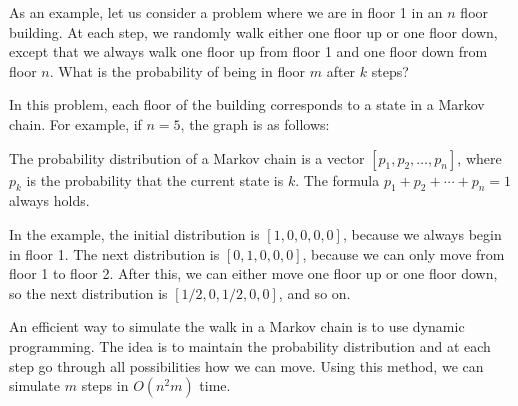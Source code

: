 As an example, let us consider a problem
where we are in floor 1 in an $n$ floor building.
At each step, we randomly walk either one floor
up or one floor down, except that we always
walk one floor up from floor 1 and one floor down
from floor $n$.
What is the probability of being in floor $m$
after $k$ steps?

In this problem, each floor of the building
corresponds to a state in a Markov chain.
For example, if $n=5$, the graph is as follows:

\begin{center}
\end{center}

The probability distribution
of a Markov chain is a vector
$[p_1,p_2,\ldots,p_n]$, where $p_k$ is the
probability that the current state is $k$.
The formula $p_1+p_2+\cdots+p_n=1$ always holds.

In the example, the initial distribution is
$[1,0,0,0,0]$, because we always begin in floor 1.
The next distribution is $[0,1,0,0,0]$,
because we can only move from floor 1 to floor 2.
After this, we can either move one floor up
or one floor down, so the next distribution is
$[1/2,0,1/2,0,0]$, and so on.

An efficient way to simulate the walk in
a Markov chain is to use dynamic programming.
The idea is to maintain the probability distribution
and at each step go through all possibilities
how we can move.
Using this method, we can simulate $m$ steps
in $O(n^2 m)$ time.

